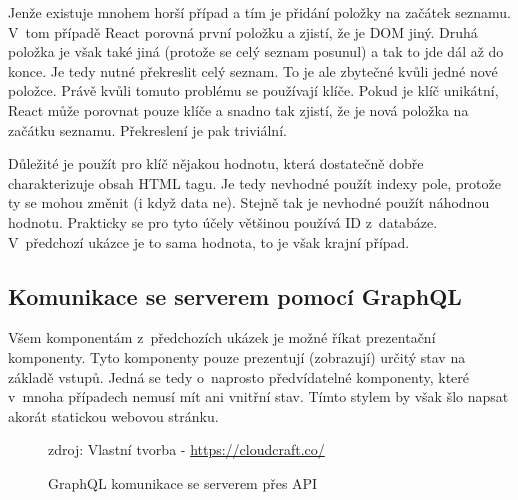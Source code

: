 Jenže existuje mnohem horší případ a tím je přidání položky na začátek seznamu. V~tom případě React porovná první položku a zjistí, že je DOM jiný. Druhá položka je však také jiná (protože se celý seznam posunul) a tak to jde dál až do konce. Je tedy nutné překreslit celý seznam. To je ale zbytečné kvůli jedné nové položce. Právě kvůli tomuto problému se používají klíče. Pokud je klíč unikátní, React může porovnat pouze klíče a snadno tak zjistí, že je nová položka na začátku seznamu. Překreslení je pak triviální.

Důležité je použít pro klíč nějakou hodnotu, která dostatečně dobře charakterizuje obsah HTML tagu. Je tedy nevhodné použít indexy pole, protože ty se mohou změnit (i když data ne). Stejně tak je nevhodné použít náhodnou hodnotu. Prakticky se pro tyto účely většinou používá ID z~databáze. V~před\-cho\-zí ukázce je to sama hodnota, to je však krajní případ.

\subsection{Komunikace se serverem pomocí GraphQL}
Všem komponentám z~předchozích ukázek je možné říkat prezentační komponenty. Tyto komponenty pouze prezentují (zobrazují) určitý stav na základě vstupů. Jedná se tedy o~naprosto předvídatelné komponenty, které v~mnoha případech nemusí mít ani vnitřní stav. Tímto stylem by však šlo napsat akorát statickou webovou stránku.

\begin{figure}[h]
	\centering
	\caption{GraphQL komunikace se serverem přes API}
	\small zdroj: Vlastní tvorba - \url{https://cloudcraft.co/}
	\label{fig:graphqlServer}
\end{figure}

